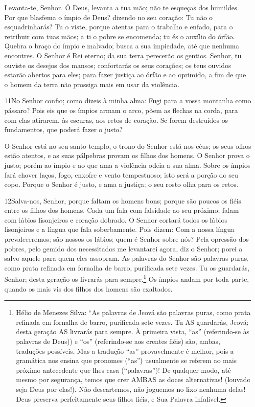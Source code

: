 Levanta-te, Senhor. Ó Deus, levanta a tua mão; não te esqueças
dos humildes. Por que blasfema o ímpio de Deus? dizendo no
seu coração: Tu não o esquadrinharás? Tu o viste, porque
atentas para o trabalho e enfado, para o retribuir com tuas mãos; a
ti o pobre se encomenda; tu és o auxílio do órfão. Quebra o
braço do ímpio e malvado; busca a sua impiedade, até que nenhuma
encontres. O Senhor é Rei eterno; da sua terra perecerão os
gentios. Senhor, tu ouviste os desejos dos mansos;
confortarás os seus corações; os teus ouvidos estarão abertos para
eles; para fazer justiça ao órfão e ao oprimido, a fim de que
o homem da terra não prossiga mais em usar da violência.

\bigskip

\lettrine{11}{}No Senhor confio; como dizeis à minha alma: Fugi
para a vossa montanha como pássaro? Pois eis que os ímpios armam
o arco, põem as flechas na corda, para com elas atirarem, às
escuras, aos retos de coração. Se forem destruídos os
fundamentos, que poderá fazer o justo?

O Senhor está no seu santo templo, o trono do Senhor está nos
céus; os seus olhos estão atentos, e as suas pálpebras provam os
filhos dos homens. O Senhor prova o justo; porém ao ímpio e ao
que ama a violência odeia a sua alma. Sobre os ímpios fará
chover laços, fogo, enxofre e vento tempestuoso; isto será a porção
do seu copo. Porque o Senhor é justo, e ama a justiça; o seu
rosto olha para os retos.

\bigskip

\lettrine{12}{}Salva-nos, Senhor, porque faltam os homens bons;
porque são poucos os fiéis entre os filhos dos homens. Cada um
fala com falsidade ao seu próximo; falam com lábios lisonjeiros e
coração dobrado. O Senhor cortará todos os lábios lisonjeiros e
a língua que fala soberbamente. Pois dizem: Com a nossa língua
prevaleceremos; são nossos os lábios; quem é Senhor sobre nós?
Pela opressão dos pobres, pelo gemido dos necessitados me
levantarei agora, diz o Senhor; porei a salvo aquele para quem eles
assopram. As palavras do Senhor são palavras puras, como prata
refinada em fornalha de barro, purificada sete vezes. Tu os
guardarás, Senhor; desta geração os livrarás para
sempre.\footnote{Hélio de Menezes Silva: ``As palavras de Jeová são
palavras puras, como prata refinada em fornalha de barro, purificada
sete vezes. Tu AS guardarás, Jeová; desta geração AS
livrarás para sempre. À primeira vista, ``as'' (referindo-se às
palavras de Deus)) e ``os'' (referindo-se aos crentes fiéis) são,
ambas, traduções possíveis. Mas a tradução ``as'' provavelmente é
melhor, pois a gramática nos ensina que pronomes (``as'') usualmente
se referem ao mais próximo antecedente que lhes casa (``palavras'')!
De qualquer modo, até mesmo por segurança, temos que crer AMBAS as
doces alternativas! (louvado seja Deus por elas!). Não descartemos,
não joguemos no lixo nenhuma delas! Deus preserva perfeitamente seus
filhos fiéis, e Sua Palavra infalível.} Os ímpios andam por toda
parte, quando os mais vis dos filhos dos homens são exaltados.

